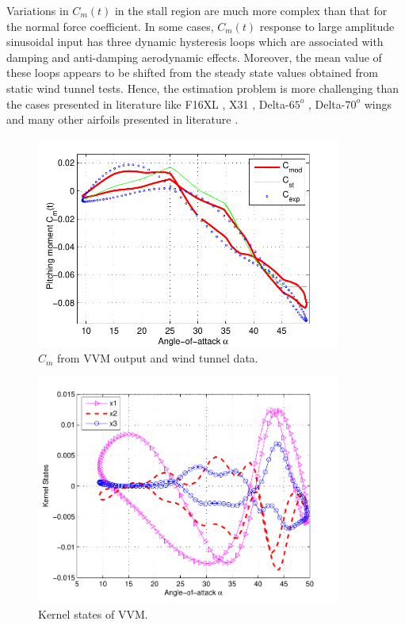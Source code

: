\documentclass{AIAA}
\begin{document}
Variations in $C_m(t)$ in the stall region are much more complex than that for the normal force coefficient. In some cases, $C_m(t)$ response to large amplitude sinusoidal input has three dynamic hysteresis loops which are associated with damping and anti-damping aerodynamic effects. Moreover, the mean value of these loops appears to be shifted from the steady state values obtained from static wind tunnel tests. Hence, the estimation problem is more challenging than the cases presented in literature like F16XL \cite{F16XLLong}, X31 \cite{X31}, Delta-$65^o$ \cite{AbramovThesis}, Delta-$70^o$ wings \cite{Nelson} and many other airfoils presented in literature \cite{Exp8Airfoil1}.
\begin{figure}[htbp]
\begin{center}
\includegraphics[width=100mm]{GTA_R63_Cm}
\caption{$C_m$ from VVM output and wind tunnel data.}
\label{fig:GTA_Cm_R63}
\end{center}
\end{figure}
\begin{figure}[htbp]
\begin{center}
\includegraphics[width=100mm]{R63_kernelstates}
\caption{Kernel states of VVM.}
\label{fig:R63_kernelstates}
\end{center}
\end{figure}
\end{document}
